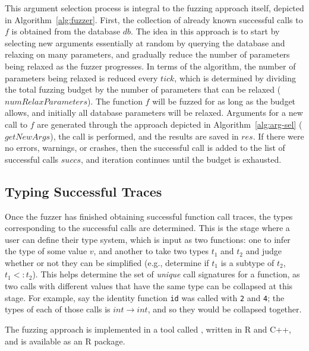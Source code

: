 \documentclass[sigplan,anonymous,review]{acmart}
\begin{document}
This argument selection process is integral to the fuzzing approach itself, depicted in Algorithm~\ref{alg:fuzzer}.
First, the collection of already known successful calls to $f$ is obtained from the database $db$.
The idea in this approach is to start by selecting new arguments essentially at random by querying the database and relaxing on many parameters, and gradually reduce the number of parameters being relaxed as the fuzzer progresses.
In terms of the algorithm, the number of parameters being relaxed is reduced every $tick$, which is determined by dividing the total fuzzing budget by the number of parameters that can be relaxed ($numRelaxParameters$).
The function $f$ will be fuzzed for as long as the budget allows, and initially all database parameters will be relaxed.
Arguments for a new call to $f$ are generated through the approach depicted in Algorithm~\ref{alg:arg-sel} ($getNewArgs$), the call is performed, and the results are saved in $res$.
If there were no errors, warnings, or crashes, then the successful call is added to the list of successful calls $succs$, and iteration continues until the budget is exhausted.



\subsection{Typing Successful Traces}

Once the fuzzer has finished obtaining successful function call traces, the types corresponding to the successful calls are determined.
This is the stage where a user can define their type system, which is input as two functions: one to infer the type of some value $v$, and another to take two types $t_1$ and $t_2$ and judge whether or not they can be simplified (e.g., determine if $t_1$ is a subtype of $t_2$, $t_1 <: t_2$).
This helps determine the set of \textit{unique} call signatures for a function, as two calls with different values that have the same type can be collapsed at this stage.
For example, say the identity function {\tt id} was called with {\tt 2} and {\tt 4}; the types of each of those calls is $int \rightarrow int$, and so they would be collapsed together. 

The fuzzing approach is implemented in a tool called \tool, written in R and C++, and is available as an R package.
\end{document}

